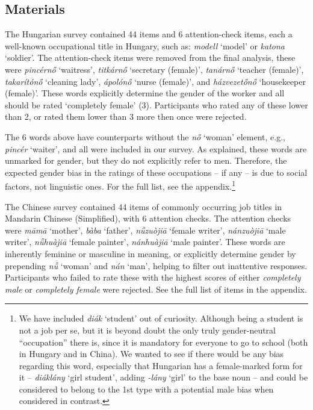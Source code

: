\documentclass[11pt]{article}
\newcommand{\zh}[1]{\simplifiedchinesefont{#1}\rmfamily}
\begin{document}
\subsection{Materials}

The Hungarian survey contained 44 items and 6 attention-check items, each a well-known occupational title in Hungary, such as: \textit{modell} `model' or \textit{katona} `soldier'. The attention-check items were removed from the final analysis, these were \textit{pincérnő} `waitress', \textit{titkárnő} `secretary (female)', \textit{tanárnő} `teacher (female)', \textit{takarítónő} `cleaning lady', \textit{ápolónő} `nurse (female)', and \textit{házvezetőnő} `housekeeper (female)'. These words explicitly determine the gender of the worker and all should be rated `completely female' (3). Participants who rated any of these lower than 2, or rated them lower than 3 more then once were rejected.

The 6 words above have counterparts without the \textit{nő} `woman' element, e.g., \textit{pincér} `waiter', and all were included in our survey. As explained, these words are unmarked for gender, but they do not explicitly refer to men. Therefore, the expected gender bias in the ratings of these occupations -- if any -- is due to social factors, not linguistic ones. For the full list, see the appendix.\footnote{We have included \textit{diák} `student' out of curiosity. Although being a student is not a job per se, but it is beyond doubt the only truly gender-neutral ``occupation'' there is, since it is mandatory for everyone to go to school (both in Hungary and in China). We wanted to see if there would be any bias regarding this word, especially that Hungarian has a female-marked form for it -- \textit{diáklány} `girl student', adding \textit{-lány} `girl' to the base noun -- and could be considered to belong to the 1st type with a potential male bias when considered in contrast.}

The Chinese survey contained 44 items of commonly occurring job titles in Mandarin Chinese (Simplified), with 6 attention checks. The attention checks were \zh{妈妈} \textit{māmā} `mother', \zh{爸爸} \textit{bàba} `father', \zh{女作家} \textit{nǚzuòjiā} `female writer', \zh{男作家} \textit{nánzuòjiā} `male writer', \zh{女画家} \textit{nǚhuàjiā} `female painter', \zh{男画家} \textit{nánhuàjiā} `male painter'. These words are inherently feminine or masculine in meaning, or explicitly determine gender by prepending \zh{女} \textit{nǚ} `woman' and \zh{男} \textit{nán} `man', helping to filter out inattentive responses. Participants who failed to rate these with the highest scores of either \textit{completely male} or \textit{completely female} were rejected. See the full list of items in the appendix.
\end{document}
